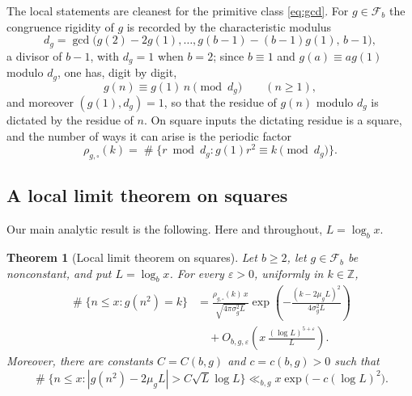\documentclass[11pt,reqno]{amsart}
\theoremstyle{plain}
\newtheorem{theorem}{Theorem}[section]
\theoremstyle{definition}
\newcommand{\Z}{\mathbb{Z}}
\newcommand{\eps}{\varepsilon}
\newcommand{\1}{\mathbf 1}
\DeclareMathOperator{\Card}{\#}
\begin{document}
The local statements are cleanest for the primitive class \eqref{eq:gcd}. For $g\in\mathcal F_b$ the congruence rigidity of $g$ is recorded by the characteristic modulus
\begin{equation}\label{eq:dg}
 d_g=\gcd\bigl(g(2)-2g(1),\ldots,g(b-1)-(b-1)g(1),\,b-1\bigr),
\end{equation}
a divisor of $b-1$, with $d_g=1$ when $b=2$; since $b\equiv1$ and $g(a)\equiv ag(1)$ modulo $d_g$, one has, digit by digit,
\begin{equation}\label{eq:congruence}
 g(n)\equiv g(1)\,n\pmod{d_g}\qquad(n\ge1),
\end{equation}
and moreover $(g(1),d_g)=1$, so that the residue of $g(n)$ modulo $d_g$ is dictated by the residue of $n$. On square inputs the dictating residue is a square, and the number of ways it can arise is the periodic factor
\begin{equation}\label{eq:rho-square-intro}
 \rho_{g,\square}(k)=
 \Card\{r\bmod d_g:g(1)r^2\equiv k\pmod{d_g}\}.
\end{equation}

\subsection{A local limit theorem on squares}
Our main analytic result is the following. Here and throughout, $L=\log_bx$.

\begin{theorem}[Local limit theorem on squares]\label{thm:square-llt-intro}
Let $b\ge2$, let $g\in\mathcal F_b$ be nonconstant, and put $L=\log_bx$.  For every $\eps>0$, uniformly in $k\in\Z$,
\begin{equation}\label{eq:square-llt-intro}
\begin{split}
 \Card\{n\le x:g(n^2)=k\}
 &=\frac{\rho_{g,\square}(k)\,x}{\sqrt{4\pi\sigma_g^2L}}
 \exp\!\left(-\frac{(k-2\mu_gL)^2}{4\sigma_g^2L}\right)\\
 &\quad+O_{b,g,\eps}\!\left(x\,\frac{(\log L)^{5+\eps}}{L}\right).
\end{split}
\end{equation}
Moreover, there are constants $C=C(b,g)$ and $c=c(b,g)>0$ such that
\begin{equation}\label{eq:square-tail-intro}
 \Card\{n\le x:|g(n^2)-2\mu_gL|>C\sqrt L\log L\}
 \ll_{b,g}x\exp\bigl(-c(\log L)^2\bigr).
\end{equation}
\end{theorem}
\end{document}
